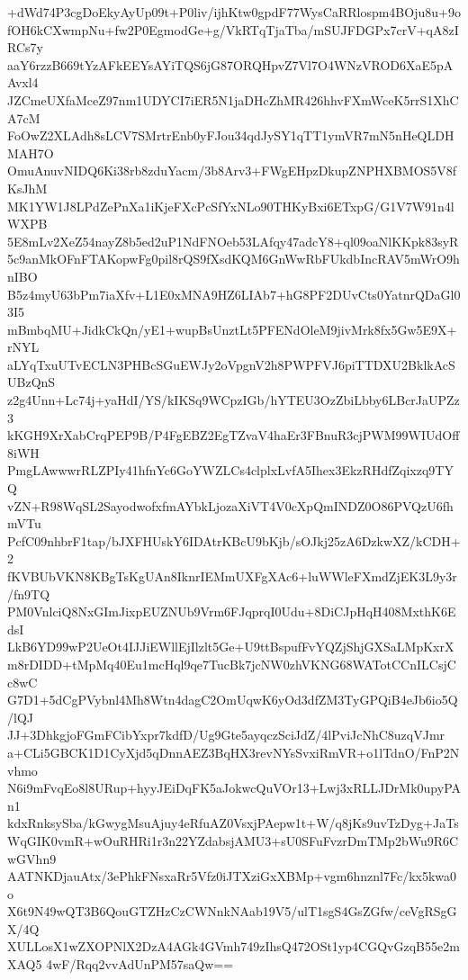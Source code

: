 +dWd74P3cgDoEkyAyUp09t+P0liv/ijhKtw0gpdF77WysCaRRlospm4BOju8u+9o
fOH6kCXwmpNu+fw2P0EgmodGe+g/VkRTqTjaTba/mSUJFDGPx7crV+qA8zIRCs7y
aaY6rzzB669tYzAFkEEYsAYiTQS6jG87ORQHpvZ7Vl7O4WNzVROD6XaE5pAAvxl4
JZCmeUXfaMceZ97nm1UDYCI7iER5N1jaDHcZhMR426hhvFXmWceK5rrS1XhCA7cM
FoOwZ2XLAdh8sLCV7SMrtrEnb0yFJou34qdJySY1qTT1ymVR7mN5nHeQLDHMAH7O
OmuAnuvNIDQ6Ki38rb8zduYacm/3b8Arv3+FWgEHpzDkupZNPHXBMOS5V8fKsJhM
MK1YW1J8LPdZePnXa1iKjeFXcPcSfYxNLo90THKyBxi6ETxpG/G1V7W91n4lWXPB
5E8mLv2XeZ54nayZ8b5ed2uP1NdFNOeb53LAfqy47adcY8+ql09oaNlKKpk83syR
5c9anMkOFnFTAKopwFg0pil8rQS9fXsdKQM6GnWwRbFUkdbIncRAV5mWrO9hnIBO
B5z4myU63bPm7iaXfv+L1E0xMNA9HZ6LIAb7+hG8PF2DUvCts0YatnrQDaGl03I5
mBmbqMU+JidkCkQn/yE1+wupBsUnztLt5PFENdOleM9jivMrk8fx5Gw5E9X+rNYL
aLYqTxuUTvECLN3PHBcSGuEWJy2oVpgnV2h8PWPFVJ6piTTDXU2BklkAcSUBzQnS
z2g4Unn+Lc74j+yaHdI/YS/kIKSq9WCpzIGb/hYTEU3OzZbiLbby6LBcrJaUPZz3
kKGH9XrXabCrqPEP9B/P4FgEBZ2EgTZvaV4haEr3FBnuR3cjPWM99WIUdOff8iWH
PmgLAwwwrRLZPIy41hfnYc6GoYWZLCs4clplxLvfA5Ihex3EkzRHdfZqixzq9TYQ
vZN+R98WqSL2SayodwofxfmAYbkLjozaXiVT4V0cXpQmINDZ0O86PVQzU6fhmVTu
PcfC09nhbrF1tap/bJXFHUskY6IDAtrKBcU9bKjb/sOJkj25zA6DzkwXZ/kCDH+2
fKVBUbVKN8KBgTsKgUAn8IknrIEMmUXFgXAc6+luWWleFXmdZjEK3L9y3r/fn9TQ
PM0VnlciQ8NxGImJixpEUZNUb9Vrm6FJqprqI0Udu+8DiCJpHqH408MxthK6EdsI
LkB6YD99wP2UeOt4IJJiEWllEjIlzlt5Ge+U9ttBspufFvYQZjShjGXSaLMpKxrX
m8rDIDD+tMpMq40Eu1mcHql9qe7TucBk7jcNW0zhVKNG68WATotCCnILCsjCc8wC
G7D1+5dCgPVybnl4Mh8Wtn4dagC2OmUqwK6yOd3dfZM3TyGPQiB4eJb6io5Q/lQJ
JJ+3DhkgjoFGmFCibYxpr7kdfD/Ug9Gte5ayqczSciJdZ/4lPviJcNhC8uzqVJmr
a+CLi5GBCK1D1CyXjd5qDnnAEZ3BqHX3revNYsSvxiRmVR+o1lTdnO/FnP2Nvhmo
N6i9mFvqEo8l8URup+hyyJEiDqFK5aJokwcQuVOr13+Lwj3xRLLJDrMk0upyPAn1
kdxRnksySba/kGwygMsuAjuy4eRfuAZ0VsxjPAepw1t+W/q8jKs9uvTzDyg+JaTs
WqGIK0vmR+wOuRHRi1r3n22YZdabsjAMU3+sU0SFuFvzrDmTMp2bWu9R6CwGVhn9
AATNKDjauAtx/3ePhkFNsxaRr5Vfz0iJTXziGxXBMp+vgm6hnznl7Fc/kx5kwa0o
X6t9N49wQT3B6QouGTZHzCzCWNnkNAab19V5/ulT1sgS4GsZGfw/ceVgRSgGX/4Q
XULLosX1wZXOPNlX2DzA4AGk4GVmh749zIhsQ472OSt1yp4CGQvGzqB55e2mXAQ5
4wF/Rqq2vvAdUnPM57saQw==
